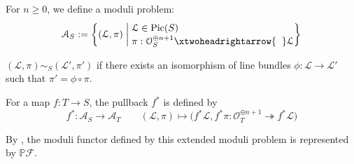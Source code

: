\begin{eg}
For $n \geqslant 0$, we define a moduli problem:
$$\mathcal{A}_S:=\left\{(\mathcal{L},\pi)  \;\middle|\; \begin{aligned}
&\\[-5mm]
&\mathcal{L} \in \Pic(S)\\[-1mm]
& \pi:\mathcal{O}_S^{\oplus n+1} \xtwoheadrightarrow{\hspace{2mm}}  \mathcal{L}
\end{aligned}
 \right\}$$
 
   $(\mathcal{L},\pi) \sim_S (\mathcal{L}',\pi')$ if there exists an isomorphism of line bundles $\phi:\mathcal{L} \longrightarrow \mathcal{L}'$ such that $\pi'=\phi \circ \pi$.
   
   For a map $f:T \longrightarrow S$, the pullback $f^*$ is defined by
      $$f^*:\mathcal{A}_S \longrightarrow \mathcal{A}_T \qquad (\mathcal{L},\pi) \longmapsto \big(f^*\mathcal{L},f^* \pi:\mathcal{O}_T^{\oplus n+1} \twoheadrightarrow f^*\mathcal{L}\big)$$
      
      By \cite[Proposition 7.12]{hartshorne2013algebraic}, the moduli functor defined by this extended moduli problem is represented by $\mathbb{P}\mathcal{F}$.
\end{eg}
